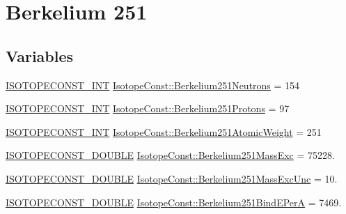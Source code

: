 \hypertarget{group___isotope_const-_berkelium-_bk251}{}\section{Berkelium 251}
\label{group___isotope_const-_berkelium-_bk251}
\subsection*{Variables}
\begin{DoxyCompactItemize}
\item 
\mbox{\hyperlink{group___isotope_const-_macros_ga5f18360b3e99483a35c32d789e62621c}{I\+S\+O\+T\+O\+P\+E\+C\+O\+N\+S\+T\+\_\+\+I\+NT}} \mbox{\hyperlink{group___isotope_const-_berkelium-_bk251_gaac2ac28f33f1bef5a41b62dfabe1fc27}{Isotope\+Const\+::\+Berkelium251\+Neutrons}} = 154
\item 
\mbox{\hyperlink{group___isotope_const-_macros_ga5f18360b3e99483a35c32d789e62621c}{I\+S\+O\+T\+O\+P\+E\+C\+O\+N\+S\+T\+\_\+\+I\+NT}} \mbox{\hyperlink{group___isotope_const-_berkelium-_bk251_ga503cfc88e007bd622bcacf3d1ebe8e59}{Isotope\+Const\+::\+Berkelium251\+Protons}} = 97
\item 
\mbox{\hyperlink{group___isotope_const-_macros_ga5f18360b3e99483a35c32d789e62621c}{I\+S\+O\+T\+O\+P\+E\+C\+O\+N\+S\+T\+\_\+\+I\+NT}} \mbox{\hyperlink{group___isotope_const-_berkelium-_bk251_ga9f84bc091d0a5efcabae071d5f805740}{Isotope\+Const\+::\+Berkelium251\+Atomic\+Weight}} = 251
\item 
\mbox{\hyperlink{group___isotope_const-_macros_ga8f45a7272ce02c0b4c65c44636ed719a}{I\+S\+O\+T\+O\+P\+E\+C\+O\+N\+S\+T\+\_\+\+D\+O\+U\+B\+LE}} \mbox{\hyperlink{group___isotope_const-_berkelium-_bk251_gae546583a6206e415d22803506316f57e}{Isotope\+Const\+::\+Berkelium251\+Mass\+Exc}} = 75228.
\item 
\mbox{\hyperlink{group___isotope_const-_macros_ga8f45a7272ce02c0b4c65c44636ed719a}{I\+S\+O\+T\+O\+P\+E\+C\+O\+N\+S\+T\+\_\+\+D\+O\+U\+B\+LE}} \mbox{\hyperlink{group___isotope_const-_berkelium-_bk251_gaee9fbffe39e581f9d1f0df975945d053}{Isotope\+Const\+::\+Berkelium251\+Mass\+Exc\+Unc}} = 10.
\item 
\mbox{\hyperlink{group___isotope_const-_macros_ga8f45a7272ce02c0b4c65c44636ed719a}{I\+S\+O\+T\+O\+P\+E\+C\+O\+N\+S\+T\+\_\+\+D\+O\+U\+B\+LE}} \mbox{\hyperlink{group___isotope_const-_berkelium-_bk251_ga22157049f9f318cd08b2831c1cc3e256}{Isotope\+Const\+::\+Berkelium251\+Bind\+E\+PerA}} = 7469.
\item 

\end{DoxyCompactItemize}
